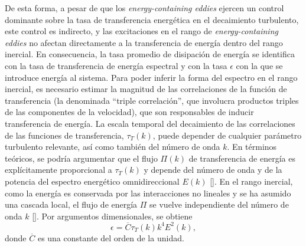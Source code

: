 De esta forma, a pesar de que los \textit{energy-containing eddies} ejercen un
control dominante sobre la tasa de transferencia energética en el
decaimiento turbulento, este control es indirecto, y las excitaciones
en el rango de \textit{energy-containing eddies} no afectan
directamente a la transferencia de energía dentro del rango
inercial. En consecuencia, la tasa promedio de disipación de energía
se identifica con la tasa de transferencia de energía espectral y con
la tasa $\epsilon$ con la que se introduce energía al sistema. Para
poder inferir la forma del espectro en el rango inercial, es necesario
estimar la magnitud de las correlaciones de la función de
transferencia (la denominada ``triple correlación'', que involucra
productos triples de las componentes de la velocidad), que son
responsables de inducir transferencia de energía. La escala temporal
del decaimiento de las correlaciones de las funciones de
transferencia, $\tau_T(k)$, puede depender de cualquier parámetro
turbulento relevante, así como también del número de onda $k$. En
términos teóricos, se podría argumentar que el flujo $\Pi(k)$ de
transferencia de energía es explícitamente proporcional a $\tau_T(k)$
y depende del número de onda y de la potencia del espectro energético
omnidireccional $E(k)$ [\cite{batchelor_theory_1953,
  monin_statistical_2013}]. En el rango inercial, como la energía es
conservada por las interacciones no lineales y se ha asumido una
cascada local, el flujo de energía $\Pi$ se vuelve independiente del
número de onda $k$ [\cite{zhou_degrees_1993,
  zhou_interacting_1993}]. Por argumentos dimensionales, se obtiene
\begin{equation}\label{eq2:transferRate}
  \epsilon = \overline{C} \tau_T(k) k^4 E^2(k),
\end{equation}
donde $\overline{C}$ es una constante del orden de la unidad.


